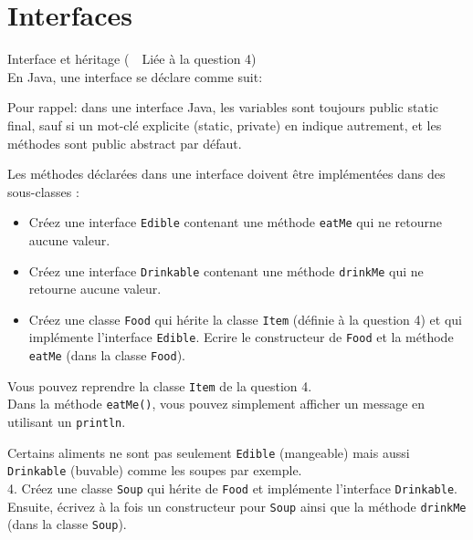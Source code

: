 \section{Interfaces}
\begin{Exercice}[15 minutes]{Interface et héritage (\faLink~~Liée à la question 4)}\\

En Java, une interface se déclare comme suit:
 

Pour rappel: dans une interface Java, les variables sont toujours public static final, sauf si un mot-clé explicite (static, private) en indique autrement, et les méthodes sont public abstract par défaut.

Les méthodes déclarées dans une interface doivent être implémentées dans des sous-classes :

 
\begin{itemize}
	\item Créez une interface \lstinline{Edible} contenant une méthode \lstinline{eatMe} qui ne retourne aucune valeur.
	\item Créez une interface \lstinline{Drinkable} contenant une méthode \lstinline{drinkMe} qui ne retourne aucune valeur.
	\item Créez une classe \lstinline{Food} qui hérite la classe \lstinline{Item} (définie à la question 4) et qui implémente l'interface \lstinline{Edible}. Ecrire le constructeur de \lstinline{Food} et la méthode \lstinline{eatMe} (dans la classe \lstinline{Food}).
\end{itemize}

\begin{conseil}
Vous pouvez reprendre la classe \lstinline{Item} de la question 4.\\
Dans la méthode \lstinline{eatMe()}, vous pouvez simplement afficher un message en utilisant un \lstinline{println}.
\end{conseil}

Certains aliments ne sont pas seulement \lstinline{Edible} (mangeable) mais aussi \lstinline{Drinkable} (buvable) comme les soupes par exemple.\\

4. Créez une classe \lstinline{Soup} qui hérite de \lstinline{Food} et implémente l'interface \lstinline{Drinkable}. Ensuite, écrivez à la fois un constructeur pour \lstinline{Soup} ainsi que la méthode \lstinline{drinkMe} (dans la classe \lstinline{Soup}).\\


\end{Exercice}
